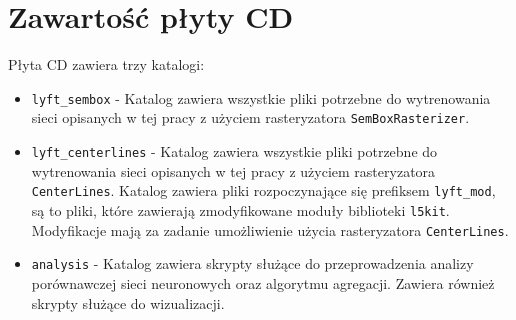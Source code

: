 \chapter{Zawartość płyty CD}
\thispagestyle{chapterBeginStyle}
\label{plytaCD}

\noindent
Płyta CD zawiera trzy katalogi:

\begin{itemize}
    \item \texttt{lyft\_sembox} - Katalog zawiera wszystkie pliki potrzebne do wytrenowania sieci opisanych w tej pracy z użyciem rasteryzatora \texttt{SemBoxRasterizer}.
    \item \texttt{lyft\_centerlines} - Katalog zawiera wszystkie pliki potrzebne do wytrenowania sieci opisanych w tej pracy z użyciem rasteryzatora \texttt{CenterLines}. Katalog zawiera pliki rozpoczynające się prefiksem \texttt{lyft\_mod}, są to pliki, które zawierają zmodyfikowane moduły biblioteki \texttt{l5kit}. Modyfikacje mają za zadanie umożliwienie użycia rasteryzatora \texttt{CenterLines}.
    \item \texttt{analysis} - Katalog zawiera skrypty służące do przeprowadzenia analizy porównawczej sieci neuronowych oraz algorytmu agregacji. Zawiera również skrypty służące do wizualizacji.
\end{itemize}